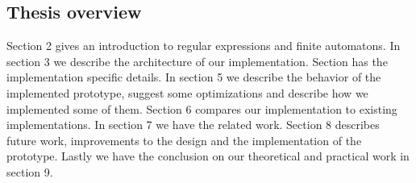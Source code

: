 \subsection{Thesis overview}

Section 2 gives an introduction to regular expressions and finite
automatons. In section 3 we describe the architecture of our
implementation. Section has the implementation specific details. In
section 5 we describe the behavior of the implemented prototype,
suggest some optimizations and describe how we implemented some of
them. Section 6 compares our implementation to existing
implementations. In section 7 we have the related work. Section 8
describes future work, improvements to the design and the
implementation of the prototype. Lastly we have the conclusion on our
theoretical and practical work in section 9.
